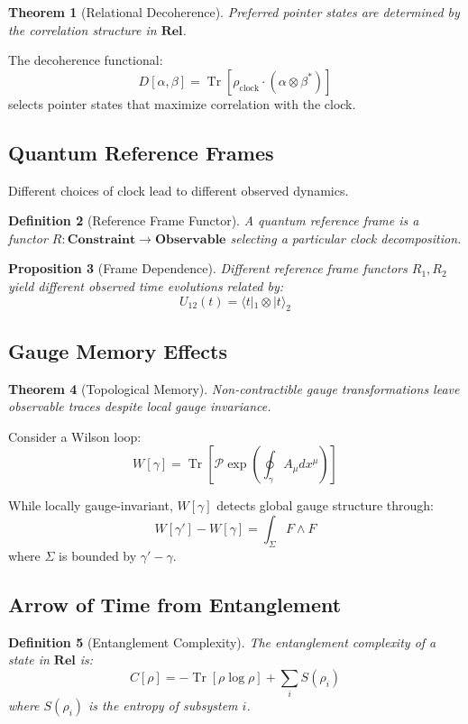 \documentclass[12pt,a4paper]{article}
\newtheorem{theorem}{Theorem}[section]
\newtheorem{proposition}[theorem]{Proposition}
\newtheorem{definition}[theorem]{Definition}
\DeclareMathOperator{\Tr}{Tr}
\begin{document}
\begin{theorem}[Relational Decoherence]
Preferred pointer states are determined by the correlation structure in $\mathbf{Rel}$.
\end{theorem}

The decoherence functional:
\[
D[\alpha, \beta] = \Tr[\rho_{\text{clock}} \cdot (\alpha \otimes \beta^*)]
\]
selects pointer states that maximize correlation with the clock.

\subsection{Quantum Reference Frames}

Different choices of clock lead to different observed dynamics.

\begin{definition}[Reference Frame Functor]
A quantum reference frame is a functor $R: \mathbf{Constraint} \to \mathbf{Observable}$ selecting a particular clock decomposition.
\end{definition}

\begin{proposition}[Frame Dependence]
Different reference frame functors $R_1, R_2$ yield different observed time evolutions related by:
\[
U_{12}(t) = \langle t|_1 \otimes |t\rangle_2
\]
\end{proposition}

\subsection{Gauge Memory Effects}

\begin{theorem}[Topological Memory]
Non-contractible gauge transformations leave observable traces despite local gauge invariance.
\end{theorem}

Consider a Wilson loop:
\[
W[\gamma] = \Tr\left[\mathcal{P}\exp\left(\oint_\gamma A_\mu dx^\mu\right)\right]
\]

While locally gauge-invariant, $W[\gamma]$ detects global gauge structure through:
\[
W[\gamma'] - W[\gamma] = \int_\Sigma F \wedge F
\]
where $\Sigma$ is bounded by $\gamma' - \gamma$.

\subsection{Arrow of Time from Entanglement}

\begin{definition}[Entanglement Complexity]
The entanglement complexity of a state in $\mathbf{Rel}$ is:
\[
C[\rho] = -\Tr[\rho \log \rho] + \sum_i S(\rho_i)
\]
where $S(\rho_i)$ is the entropy of subsystem $i$.
\end{definition}
\end{document}
